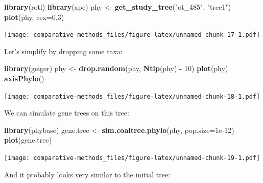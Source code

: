 \documentclass[]{article}
\newenvironment{Shaded}{\begin{snugshade}}{\end{snugshade}}
\newcommand{\DataTypeTok}[1]{\textcolor[rgb]{0.13,0.29,0.53}{#1}}
\newcommand{\DecValTok}[1]{\textcolor[rgb]{0.00,0.00,0.81}{#1}}
\newcommand{\FloatTok}[1]{\textcolor[rgb]{0.00,0.00,0.81}{#1}}
\newcommand{\KeywordTok}[1]{\textcolor[rgb]{0.13,0.29,0.53}{\textbf{#1}}}
\newcommand{\NormalTok}[1]{#1}
\newcommand{\OperatorTok}[1]{\textcolor[rgb]{0.81,0.36,0.00}{\textbf{#1}}}
\newcommand{\StringTok}[1]{\textcolor[rgb]{0.31,0.60,0.02}{#1}}
\theoremstyle{definition}
\theoremstyle{definition}
\theoremstyle{definition}
\theoremstyle{remark}
\begin{document}
\begin{Shaded}
\begin{Highlighting}[]
\KeywordTok{library}\NormalTok{(rotl)}
\KeywordTok{library}\NormalTok{(ape)}
\NormalTok{phy <-}\StringTok{ }\KeywordTok{get_study_tree}\NormalTok{(}\StringTok{"ot_485"}\NormalTok{, }\StringTok{"tree1"}\NormalTok{)}
\KeywordTok{plot}\NormalTok{(phy, }\DataTypeTok{cex=}\FloatTok{0.3}\NormalTok{)}
\end{Highlighting}
\end{Shaded}

\texttt{[image: comparative-methods\_files/figure-latex/unnamed-chunk-17-1.pdf]}

Let's simplify by dropping some taxa:

\begin{Shaded}
\begin{Highlighting}[]
\KeywordTok{library}\NormalTok{(geiger)}
\NormalTok{phy <-}\StringTok{ }\KeywordTok{drop.random}\NormalTok{(phy, }\KeywordTok{Ntip}\NormalTok{(phy) }\OperatorTok{-}\StringTok{ }\DecValTok{10}\NormalTok{)}
\KeywordTok{plot}\NormalTok{(phy)}
\KeywordTok{axisPhylo}\NormalTok{()}
\end{Highlighting}
\end{Shaded}

\texttt{[image: comparative-methods\_files/figure-latex/unnamed-chunk-18-1.pdf]}

We can simulate gene trees on this tree:

\begin{Shaded}
\begin{Highlighting}[]
\KeywordTok{library}\NormalTok{(phybase)}
\NormalTok{gene.tree <-}\StringTok{ }\KeywordTok{sim.coaltree.phylo}\NormalTok{(phy, }\DataTypeTok{pop.size=}\FloatTok{1e-12}\NormalTok{)}
\KeywordTok{plot}\NormalTok{(gene.tree)}
\end{Highlighting}
\end{Shaded}

\texttt{[image: comparative-methods\_files/figure-latex/unnamed-chunk-19-1.pdf]}

And it probably looks very similar to the initial tree:

\begin{Shaded}
\end{Shaded}
\end{document}

